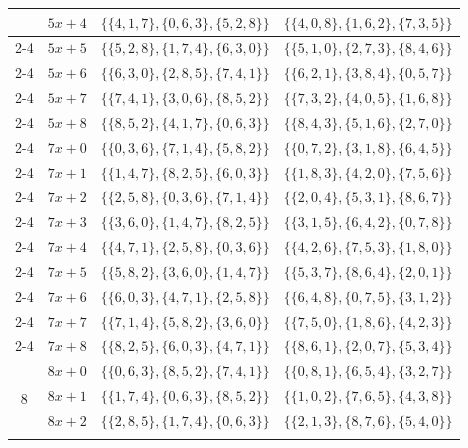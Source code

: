 \documentclass[preprint,11pt]{elsarticle}
\begin{document}
\begin{center}
\begin{longtable}{|c|c|c|c|}
        & $5x+4$  & $\{\{4,1,7\}, \{0,6,3\}, \{5,2,8\}\}$ & $\{\{4,0,8\}, \{1,6,2\}, \{7,3,5\}\}$ \\ \cline{2-4}
        & $5x+5$  & $\{\{5,2,8\}, \{1,7,4\}, \{6,3,0\}\}$ & $\{\{5,1,0\}, \{2,7,3\}, \{8,4,6\}\}$ \\ \cline{2-4}
        & $5x+6$  & $\{\{6,3,0\}, \{2,8,5\}, \{7,4,1\}\}$ & $\{\{6,2,1\}, \{3,8,4\}, \{0,5,7\}\}$ \\ \cline{2-4}
         & $5x+7$  & $\{\{7,4,1\}, \{3,0,6\}, \{8,5,2\}\}$ & $\{\{7,3,2\}, \{4,0,5\}, \{1,6,8\}\}$ \\ \cline{2-4}
       & $5x+8$  & $\{\{8,5,2\}, \{4,1,7\}, \{0,6,3\}\}$ & $\{\{8,4,3\}, \{5,1,6\}, \{2,7,0\}\}$ \\ \cline{2-4}
        \hline \hline \multirow{9}{*}{7} 
        & $7x+0$ & $\{\{0,3,6\}, \{7,1,4\}, \{5,8,2\}\}$ & $\{\{0,7,2\}, \{3,1,8\}, \{6,4,5\}\}$ \\ \cline{2-4}
        & $7x+1$ & $\{\{1,4,7\}, \{8,2,5\}, \{6,0,3\}\}$ & $\{\{1,8,3\}, \{4,2,0\}, \{7,5,6\}\}$ \\ \cline{2-4}
         & $7x+2$ & $\{\{2,5,8\}, \{0,3,6\}, \{7,1,4\}\}$ & $\{\{2,0,4\}, \{5,3,1\}, \{8,6,7\}\}$ \\ \cline{2-4}
        & $7x+3$ & $\{\{3,6,0\}, \{1,4,7\}, \{8,2,5\}\}$ & $\{\{3,1,5\}, \{6,4,2\}, \{0,7,8\}\}$ \\ \cline{2-4}
     & $7x+4$ & $\{\{4,7,1\}, \{2,5,8\}, \{0,3,6\}\}$ & $\{\{4,2,6\}, \{7,5,3\}, \{1,8,0\}\}$ \\ \cline{2-4}
       & $7x+5$ & $\{\{5,8,2\}, \{3,6,0\}, \{1,4,7\}\}$ & $\{\{5,3,7\}, \{8,6,4\}, \{2,0,1\}\}$ \\ \cline{2-4}
       & $7x+6$ & $\{\{6,0,3\}, \{4,7,1\}, \{2,5,8\}\}$ & $\{\{6,4,8\}, \{0,7,5\}, \{3,1,2\}\}$ \\ \cline{2-4}
      & $7x+7$ & $\{\{7,1,4\}, \{5,8,2\}, \{3,6,0\}\}$ & $\{\{7,5,0\}, \{1,8,6\}, \{4,2,3\}\}$ \\ \cline{2-4}
       & $7x+8$ & $\{\{8,2,5\}, \{6,0,3\}, \{4,7,1\}\}$ & $\{\{8,6,1\}, \{2,0,7\}, \{5,3,4\}\}$\\ \hline
        \hline
         \multirow{9}{*}{8} 
        & $8x+0$ & $\{\{0,6,3\}, \{8,5,2\}, \{7,4,1\}\}$ & $\{\{0,8,1\}, \{6,5,4\}, \{3,2,7\}\}$ \\ \cline{2-4}
        & $8x+1$ & $\{\{1,7,4\}, \{0,6,3\}, \{8,5,2\}\}$ & $\{\{1,0,2\}, \{7,6,5\}, \{4,3,8\}\}$ \\ \cline{2-4}
        & $8x+2$ & $\{\{2,8,5\}, \{1,7,4\}, \{0,6,3\}\}$ & $\{\{2,1,3\}, \{8,7,6\}, \{5,4,0\}\}$ \\ \cline{2-4}

\end{longtable}
\end{center}
\end{document}
